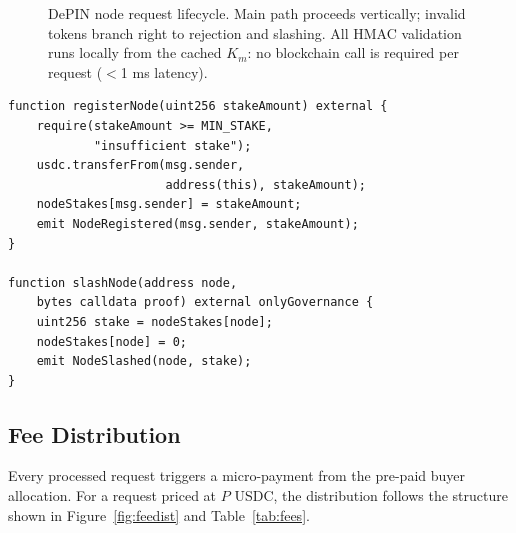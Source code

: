 \documentclass[conference]{IEEEtran}
\begin{document}
\begin{figure}[!t]
\caption{DePIN node request lifecycle. Main path proceeds vertically; invalid tokens
branch right to rejection and slashing. All HMAC validation runs locally from the
cached $K_m$: no blockchain call is required per request ($<$1 ms latency).}
\label{fig:depinflow}
\end{figure}

\begin{lstlisting}[language={}, caption={Node Registration and Slashing}]
function registerNode(uint256 stakeAmount) external {
    require(stakeAmount >= MIN_STAKE,
            "insufficient stake");
    usdc.transferFrom(msg.sender,
                      address(this), stakeAmount);
    nodeStakes[msg.sender] = stakeAmount;
    emit NodeRegistered(msg.sender, stakeAmount);
}

function slashNode(address node,
    bytes calldata proof) external onlyGovernance {
    uint256 stake = nodeStakes[node];
    nodeStakes[node] = 0;
    emit NodeSlashed(node, stake);
}
\end{lstlisting}

\subsection{Fee Distribution}
Every processed request triggers a micro-payment from the pre-paid buyer allocation.
For a request priced at $P$ USDC, the distribution follows the structure shown in
Figure~\ref{fig:feedist} and Table~\ref{tab:fees}.
\end{document}
